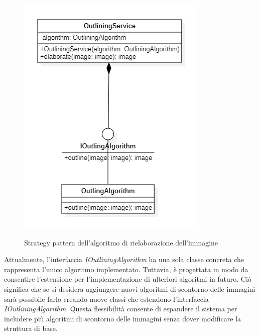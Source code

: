 \begin{figure}[H]
    \centering
    \includegraphics[scale = 0.8]{img/outlineStrategy.png}\\
    \caption{Strategy pattern dell'algoritmo di rielaborazione dell'immagine}
\end{figure}

Attualmente, l'interfaccia \textit{IOutliningAlgorithm} ha una sola classe concreta che rappresenta l'unico algoritmo implementato. Tuttavia, è progettata in modo da consentire l'estensione per l'implementazione di ulteriori 
algoritmi in futuro. Ciò significa che se si desidera aggiungere nuovi algoritmi di scontorno delle immagini sarà possibile farlo creando nuove classi che estendono l'interfaccia \textit{IOutliningAlgorithm}. 
Questa flessibilità consente di espandere il sistema per includere più algoritmi di scontorno delle immagini senza dover 
modificare la struttura di base.

